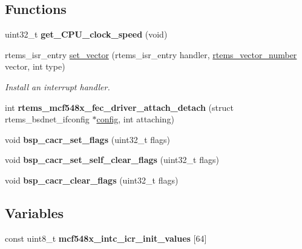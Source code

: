 \subsection*{Functions}
\begin{DoxyCompactItemize}
\item 
\mbox{\label{group__RTEMSBSPsM68kGenMCF548X_gaac0f9f3f7c56eaee7f0d4ddcca226d24}} 
uint32\+\_\+t {\bfseries get\+\_\+\+C\+P\+U\+\_\+clock\+\_\+speed} (void)
\item 
rtems\+\_\+isr\+\_\+entry \mbox{\hyperlink{group__RTEMSBSPsM68kGenMCF548X_gab3388042c56b34c40be81fd5f028d97e}{set\+\_\+vector}} (rtems\+\_\+isr\+\_\+entry handler, \mbox{\hyperlink{group__ClassicINTR_ga3e434c197d99f128e78cae4d9358bd8b}{rtems\+\_\+vector\+\_\+number}} vector, int type)
\begin{DoxyCompactList}\small\item\em Install an interrupt handler. \end{DoxyCompactList}\item 
\mbox{\label{group__RTEMSBSPsM68kGenMCF548X_gaa9b8116b38adcd4fdd798acb2e1484a6}} 
int {\bfseries rtems\+\_\+mcf548x\+\_\+fec\+\_\+driver\+\_\+attach\+\_\+detach} (struct rtems\+\_\+bsdnet\+\_\+ifconfig $\ast$\mbox{\hyperlink{structconfig__s}{config}}, int attaching)
\item 
\mbox{\label{group__RTEMSBSPsM68kGenMCF548X_gaec18a3e55dd7eee61934298de30e0da1}} 
void {\bfseries bsp\+\_\+cacr\+\_\+set\+\_\+flags} (uint32\+\_\+t flags)
\item 
\mbox{\label{group__RTEMSBSPsM68kGenMCF548X_ga4792cdcc3d5b7dfdbed2b9a223b2050b}} 
void {\bfseries bsp\+\_\+cacr\+\_\+set\+\_\+self\+\_\+clear\+\_\+flags} (uint32\+\_\+t flags)
\item 
\mbox{\label{group__RTEMSBSPsM68kGenMCF548X_ga45bd82ec45dc1ab01f3f45f403fdffa5}} 
void {\bfseries bsp\+\_\+cacr\+\_\+clear\+\_\+flags} (uint32\+\_\+t flags)
\end{DoxyCompactItemize}
\subsection*{Variables}
\begin{DoxyCompactItemize}
\item 
\mbox{\label{group__RTEMSBSPsM68kGenMCF548X_gaa7dd83b572ef4671cede555db99fd128}} 
const uint8\+\_\+t {\bfseries mcf548x\+\_\+intc\+\_\+icr\+\_\+init\+\_\+values} \mbox{[}64\mbox{]}
\end{DoxyCompactItemize}



